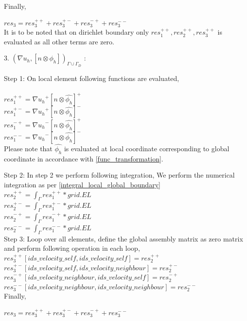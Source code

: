 \documentclass[a4paper,12pt]{book}
\begin{document}
Finally,

$res_3 = res_3^{++} + res_3^{+-} + res_3^{-+} + res_3^{--}$\\

It is to be noted that on dirichlet boundary only $res_1^{++}, res_2^{++}, res_3^{++}$ is evaluated as all other terms are zero.

3. $({\nabla u_h}, [n \otimes \phi_h])_{\Gamma \cup \Gamma_D}$ :

Step 1: On local element following functions are evaluated,\\
\\
$res_1^{++} = {\nabla u_h}^+ [n \otimes \hat{\phi_h}]^+$\\
$res_1^{+-} = {\nabla u_h}^+ [n \otimes \hat{\phi_h}]^-$\\
$res_1^{-+} = {\nabla u_h}^- [n \otimes \hat{\phi_h}]^+$\\
$res_1^{--} = {\nabla u_h}^- [n \otimes \hat{\phi_h}]^-$\\

Please note that $\hat{\phi_h}$ is evaluated at local coordinate corresponding to global coordinate in accordance with \ref{func_transformation}.

Step 2: In step 2 we perform following integration, 
We perform the numerical integration as per \ref{integral_local_global_boundary}
\\ 
$res_2^{++} = \int_{\Gamma} res_1^{++} * grid.EL$\\
$res_2^{+-} = \int_{\Gamma} res_1^{+-} * grid.EL$\\
$res_2^{-+} = \int_{\Gamma} res_1^{-+} * grid.EL$\\
$res_2^{--} = \int_{\Gamma} res_1^{--} * grid.EL$\\

Step 3: Loop over all elements, define the global assembly matrix as zero matrix and perform following operation in each loop,
\\
$res_3^{++}[ids\_velocity\_self,ids\_velocity\_self] = res_2^{++}$\\
$res_3^{+-}[ids\_velocity\_self,ids\_velocity\_neighbour] = res_2^{+-}$\\
$res_3^{-+}[ids\_velocity\_neighbour,ids\_velocity\_self] = res_2^{-+}$\\
$res_3^{--}[ids\_velocity\_neighbour,ids\_velocity\_neighbour] = res_2^{--}$\\

Finally,

$res_3 = res_3^{++} + res_3^{+-} + res_3^{-+} + res_3^{--}$\\
\end{document}
